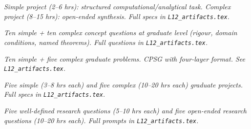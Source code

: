 \begin{tcolorbox}[ugprobbox, title={SPJU + CPJU · L12 · Tiers 2–3}]
\textit{Simple project (2–6 hrs): structured computational/analytical task.
Complex project (8–15 hrs): open-ended synthesis.
Full specs in \texttt{L12_artifacts.tex}.}
\end{tcolorbox}

\begin{tcolorbox}[gradconceptbox, title={SCQG + CCQG · L12 · Tiers 4–5}]
\textit{Ten simple + ten complex concept questions at graduate level (rigour, domain
conditions, named theorems). Full questions in \texttt{L12_artifacts.tex}.}
\end{tcolorbox}

\begin{tcolorbox}[gradprobbox, title={SPSG + CPSG · L12 · Tiers 4–5}]
\textit{Ten simple + five complex graduate problems.
CPSG with four-layer format. See \texttt{L12_artifacts.tex}.}
\end{tcolorbox}

\begin{tcolorbox}[gradprobbox, title={SPJG (×5) + CPJG (×5) · L12 · Tiers 4–5}]
\textit{Five simple (3–8 hrs each) and five complex (10–20 hrs each) graduate projects.
Full specs in \texttt{L12_artifacts.tex}.}
\end{tcolorbox}

\begin{tcolorbox}[researchbox, title={WRQ (×5) + ORQ (×5) · L12 · Tiers 4–5}]
\textit{Five well-defined research questions (5–10 hrs each) and five open-ended
research questions (10–20 hrs each). Full prompts in \texttt{L12_artifacts.tex}.}
\end{tcolorbox}
